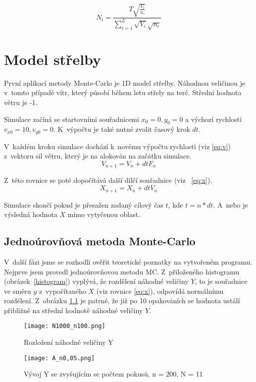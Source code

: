 \documentclass[FM, RP]{tulthesis}
\begin{document}


$$N_{i} = \frac{T \sqrt{\frac{V_{i}}{n_{i}}}}{ \sum_{i=1}^{L} \sqrt{V_{i}} \sqrt{n_{i}}}$$


\chapter{Model střelby}
První aplikací metody Monte-Carlo je 1D model střelby. Náhodnou veličinou je v~tomto případě vítr, který působí během letu střely na terč. Střední hodnota větru je -1.

Simulace začíná se startovními souřadnicemi $x_{0} = 0, y_{0} = 0$ a výchozí rychlostí $v_{x0} = 10, v_{y0} = 0$. K~výpočtu je také nutné zvolit časový krok $dt$.

V~každém kroku simulace dochází k~novému výpočtu rychlosti (viz \ref{eq:v}) z~vektoru sil větru, který je na alokován na začátku simulace.
\begin{equation}\label{eq:v} 
V_{n+1} = V_{n} + dtF_{n}
\end{equation}


\noindent  Z~této rovnice se poté dopočítává další dílčí souřadnice (viz ~\ref{eq:x}).
\begin{equation}\label{eq:x}
X_{n+1} = X_{n} + dtV_{n}
\end{equation}

Simulace skončí pokud je přesažen zadaný cílový čas $t$, kde $t =n*dt$. A~nebo je výsledná hodnota $X$  mimo vytyčenou oblast.


\section{Jednoúrovňová metoda Monte-Carlo}
V~další fázi jsme se rozhodli ověřit teoretické poznatky na vytvořeném programu.
Nejprve jsem provedl jednoúrovňovou metodu MC. Z~přiloženého histogramu (obrázek~\ref{histogram}) vyplývá, že rozdělení náhodné veličiny $Y$, to je souřadnice ve směru $y$ z~vypočítaného $X$ (viz rovnice  \ref{eq:x}), odpovídá normálnímu rozdělení. Z~obrázku \ref{graf} je patrné, že již po 10 opakováních se hodnota ustálí přibližně na střední hodnotě náhodné veličiny $Y$.

\begin{figure}[!htb]
  \centering
  \texttt{[image: N1000\_n100.png]}
  \caption{Rozložení náhodné veličiny Y}
  \label{histogram}

  \centering
  \texttt{[image: A\_n0,05.png]}
  \caption{Vývoj Y se zvyšujícím se počtem pokusů, n = 200, N = 11}
  \label{graf}
\end{figure}
\end{document}
